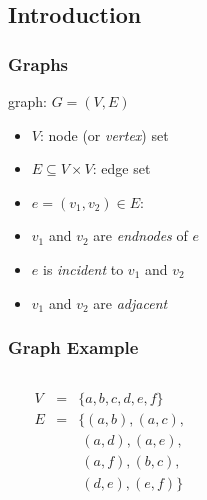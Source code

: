 \documentclass[dvipsnames]{beamer}
\begin{document}
\subsection{Introduction}

\begin{frame}
  \frametitle{Graphs}

  \begin{definition}
    \alert{graph}: $G=(V,E)$

    \begin{itemize}
      \item $V$: \alert{node} (or \emph{vertex}) set
      \item $E \subseteq V \times V$: \alert{edge} set
    \end{itemize}
  \end{definition}

  \pause
  \begin{itemize}
    \item $e=(v_1,v_2) \in E$:
    \smallskip
    \item $v_1$ and $v_2$ are \emph{endnodes} of $e$
    \item $e$ is \emph{incident} to $v_1$ and $v_2$
    \item $v_1$ and $v_2$ are \emph{adjacent}
  \end{itemize}
\end{frame}

\begin{frame}
  \frametitle{Graph Example}

  \begin{columns}
    \begin{center}
    \end{center}

    $\begin{array}{lcl}
      V & = & \{a,b,c,d,e,f\}\\
      E & = & \{(a,b),(a,c),\\
        &   & ~(a,d),(a,e),\\
        &   & ~(a,f),(b,c),\\
        &   & ~(d,e),(e,f)\}
    \end{array}$
  \end{columns}
\end{frame}
\end{document}
